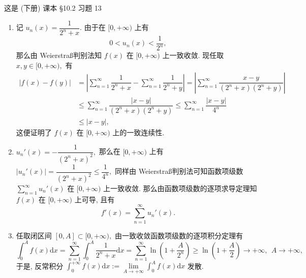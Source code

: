 \begin{solution}
  这是 (下册) 课本 \S 10.2 习题 13

  \begin{enumerate}
    \item 记 $u_n(x) = \dfrac{1}{2^n + x}.$ 由于在 $[0, +\infty)$ 上有
    $$0 < u_n(x) < \dfrac{1}{2^n},$$
    那么由 Weierstra\ss 判别法知 $f(x)$ 在 $[0, +\infty)$ 上一致收敛. 现任取 $x, y \in [0, +\infty),$ 有
    \begin{align*}
      \lvert f(x) - f(y) \rvert & = \left\lvert \sum\limits_{n=1}^\infty \dfrac{1}{2^n + x} - \sum\limits_{n=1}^\infty \dfrac{1}{2^n + y} \right\rvert = \left\lvert \sum\limits_{n=1}^\infty \dfrac{x - y}{(2^n + x)(2^n + y)} \right\rvert \\
      & \leqslant \sum\limits_{n=1}^\infty \dfrac{\lvert x - y \rvert}{(2^n + x)(2^n + y)} \leqslant \sum\limits_{n=1}^\infty \dfrac{\lvert x - y \rvert}{4^n} \\
      & \leqslant \lvert x - y \rvert,
    \end{align*}
    这便证明了 $f(x)$ 在 $[0, +\infty)$ 上的一致连续性.
    \item $u_n'(x) = -\dfrac{1}{\left(2^n + x\right)^2},$ 那么在 $[0, +\infty)$ 上有 $\lvert u_n'(x) \rvert = \dfrac{1}{\left(2^n + x\right)^2} \leqslant \dfrac{1}{4^n},$ 同样由 Weierstra\ss 判别法可知函数项级数 $\sum\limits_{n=1}^\infty u_n'(x)$ 在 $[0, +\infty)$ 上一致收敛. 那么由函数项级数的逐项求导定理知 $f(x)$ 在 $[0, +\infty)$ 上可导, 且有
    $$f'(x) = \sum\limits_{n=1}^\infty u_n'(x).$$
    \item 任取闭区间 $[0, A] \subset [0, +\infty),$ 由一致收敛函数项级数的逐项积分定理有
    $$\int_0^{A} f(x) \mathrm{d} x = \sum\limits_{n=1}^\infty \int_0^{A} \dfrac{1}{2^n + x} \mathrm{d} x = \sum\limits_{n=1}^\infty \ln \left( 1 + \dfrac{A}{2^n} \right) \geqslant \ln \left( 1 + \dfrac{A}{2} \right) \to +\infty, ~~ A \to +\infty,$$
    于是, 反常积分 $\int_0^{+\infty} f(x) \mathrm{d} x := \lim\limits_{A \to +\infty} \int_0^{A} f(x) \mathrm{d} x$ 发散.
  \end{enumerate}
\end{solution}

